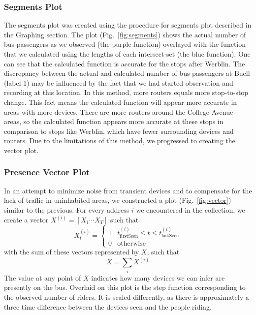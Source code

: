 \subsubsection*{Segments Plot}
The segments plot was created using the procedure for segments plot described in the Graphing section.
The plot (Fig.~\ref{fig:segments}) shows the actual number of bus passengers as we observed (the purple function) overlayed with the function that we calculated using the lengths of each intersect-set (the blue function).
One can see that the calculated function is accurate for the stops after Werblin.
The discrepancy between the actual and calculated number of bus passengers at Buell (label 1) may be influenced by the fact that we had started observation and recording at this location. In this method, more routers equals more stop-to-stop change.
This fact means the calculated function will appear more accurate in areas with more devices.
There are more routers around the College Avenue areas, so the calculated function appears more accurate at these stops in comparison to stops like Werblin, which have fewer surrounding devices and routers.
Due to the limitations of this method, we progressed to creating the vector plot.

\subsubsection*{Presence Vector Plot}

In an attempt to minimize noise from transient devices and to compensate for the lack of traffic in uninhabited areas, we constructed a plot (Fig.~\ref{fig:vector}) similar to the previous. 
For every address $i$ we encountered in the collection, we create a vector \(X^{(i)}= [ X_1 \cdots X_T ] \) such that
\begin{equation*}
  X_t^{(i)} = \begin{cases}
    1 & t_{\text{firstSeen}}^{(i)} \le t \le t_{\text{lastSeen}}^{(i)}\\
    0 & \text{otherwise}
  \end{cases}
\end{equation*}
with the sum of these vectors represented by $X$, such that \[X = \sum\limits_i X^{(i)}\]
The value at any point of $X$ indicates how many devices we can infer are presently on the bus.
Overlaid on this plot is the step function corresponding to the observed number of riders.
It is scaled differently, as there is approximately a three time difference between the devices seen and the people riding.

